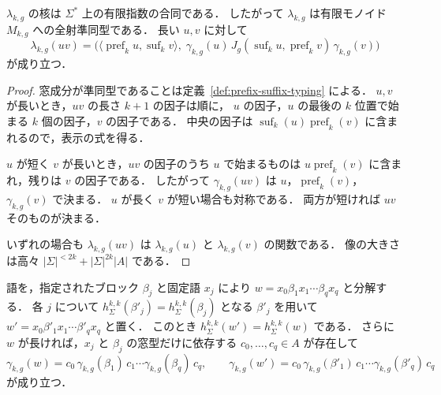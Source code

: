 \begin{lemma}[局所群型付けは準同型である]
\label{lem:local-group-morphism}
$\lambda_{k,g}$ の核は $\Sigma^*$ 上の有限指数の合同である．
したがって $\lambda_{k,g}$ は有限モノイド $M_{k,g}$ への全射準同型である．
長い $u,v$ に対して
\[
 \lambda_{k,g}(uv)
 =\bigl(\langle\operatorname{pref}_k u,\operatorname{suf}_k v\rangle,\;
   \gamma_{k,g}(u)\,J_g(\operatorname{suf}_k u,\operatorname{pref}_k v)\,
   \gamma_{k,g}(v)\bigr)
\]
が成り立つ．
\end{lemma}

\begin{proof}
窓成分が準同型であることは定義~\ref{def:prefix-suffix-typing} による．
$u,v$ が長いとき，$uv$ の長さ $k+1$ の因子は順に，
$u$ の因子，$u$ の最後の $k$ 位置で始まる $k$ 個の因子，$v$ の因子である．
中央の因子は $\operatorname{suf}_k(u)\operatorname{pref}_k(v)$ に含まれるので，表示の式を得る．

$u$ が短く $v$ が長いとき，$uv$ の因子のうち $u$ で始まるものは
$u\operatorname{pref}_k(v)$ に含まれ，残りは $v$ の因子である．
したがって $\gamma_{k,g}(uv)$ は $u$，$\operatorname{pref}_k(v)$，$\gamma_{k,g}(v)$ で決まる．
$u$ が長く $v$ が短い場合も対称である．
両方が短ければ $uv$ そのものが決まる．

いずれの場合も $\lambda_{k,g}(uv)$ は $\lambda_{k,g}(u)$ と $\lambda_{k,g}(v)$ の関数である．
像の大きさは高々 $|\Sigma|^{<2k}+|\Sigma|^{2k}|A|$ である．
\end{proof}

\begin{lemma}[ブロック分解]
\label{lem:local-group-blocks}
語を，指定されたブロック $\beta_j$ と固定語 $x_j$ により
$w=x_0\beta_1x_1\cdots\beta_qx_q$ と分解する．
各 $j$ について $h^{k,k}_\Sigma(\beta'_j)=h^{k,k}_\Sigma(\beta_j)$ となる $\beta'_j$ を用いて
$w'=x_0\beta'_1x_1\cdots\beta'_qx_q$ と置く．
このとき $h^{k,k}_\Sigma(w')=h^{k,k}_\Sigma(w)$ である．
さらに $w$ が長ければ，$x_j$ と $\beta_j$ の窓型だけに依存する
$c_0,\ldots,c_q\in A$ が存在して
\[
 \gamma_{k,g}(w)=c_0\,\gamma_{k,g}(\beta_1)\,c_1\cdots
   \gamma_{k,g}(\beta_q)\,c_q,
 \qquad
 \gamma_{k,g}(w')=c_0\,\gamma_{k,g}(\beta'_1)\,c_1\cdots
   \gamma_{k,g}(\beta'_q)\,c_q
\]
が成り立つ．
\end{lemma}

